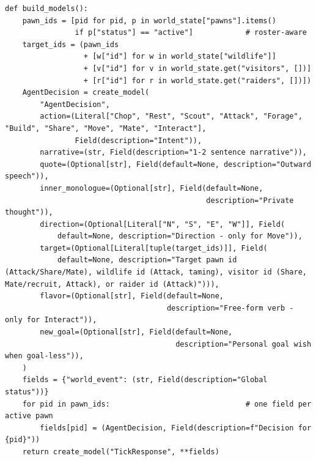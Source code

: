 \documentclass[10pt,a4paper]{article}
\begin{document}
\begin{lstlisting}[style=python, caption={Dynamic LLM Output Schema (schema.py, condensed). Uses \texttt{Literal[tuple(pawn\_ids + wildlife\_ids + visitor\_ids + raider\_ids)]} for Python 3.10 compatibility (PEP 586)}, label={lst:schema}]
def build_models():
    pawn_ids = [pid for pid, p in world_state["pawns"].items()
                if p["status"] == "active"]            # roster-aware
    target_ids = (pawn_ids
                  + [w["id"] for w in world_state["wildlife"]]
                  + [v["id"] for v in world_state.get("visitors", [])]
                  + [r["id"] for r in world_state.get("raiders", [])])
    AgentDecision = create_model(
        "AgentDecision",
        action=(Literal["Chop", "Rest", "Scout", "Attack", "Forage", "Build", "Share", "Move", "Mate", "Interact"],
                Field(description="Intent")),
        narrative=(str, Field(description="1-2 sentence narrative")),
        quote=(Optional[str], Field(default=None, description="Outward speech")),
        inner_monologue=(Optional[str], Field(default=None,
                                              description="Private thought")),
        direction=(Optional[Literal["N", "S", "E", "W"]], Field(
            default=None, description="Direction - only for Move")),
        target=(Optional[Literal[tuple(target_ids)]], Field(
            default=None, description="Target pawn id (Attack/Share/Mate), wildlife id (Attack, taming), visitor id (Share, Mate/recruit, Attack), or raider id (Attack)"))),
        flavor=(Optional[str], Field(default=None,
                                     description="Free-form verb - only for Interact")),
        new_goal=(Optional[str], Field(default=None,
                                       description="Personal goal wish when goal-less")),
    )
    fields = {"world_event": (str, Field(description="Global status"))}
    for pid in pawn_ids:                               # one field per active pawn
        fields[pid] = (AgentDecision, Field(description=f"Decision for {pid}"))
    return create_model("TickResponse", **fields)
\end{lstlisting}
\end{document}

